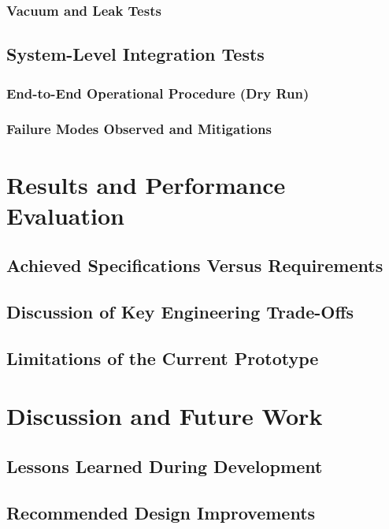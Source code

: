 \documentclass[FM,DP,EN,twoside]{tulthesis}
\begin{document}
\subsection{Vacuum and Leak Tests}
\label{subsec:vacuum-leak-tests}
\section{System-Level Integration Tests}
\label{sec:system-level-integration-tests}
\subsection{End-to-End Operational Procedure (Dry Run)}
\label{subsec:end-to-end-operational-procedure}
\subsection{Failure Modes Observed and Mitigations}
\label{subsec:failure-modes-mitigations}

\chapter{Results and Performance Evaluation}
\label{sec:results-performance-evaluation}
\section{Achieved Specifications Versus Requirements}
\label{sec:achieved-specs-vs-requirements}
\section{Discussion of Key Engineering Trade-Offs}
\label{sec:engineering-trade-offs}
\section{Limitations of the Current Prototype}
\label{sec:limitations-current-prototype}

\chapter{Discussion and Future Work}
\label{sec:discussion-future-work}
\section{Lessons Learned During Development}
\label{sec:lessons-learned}
\section{Recommended Design Improvements}
\label{sec:recommended-improvements}
\end{document}
